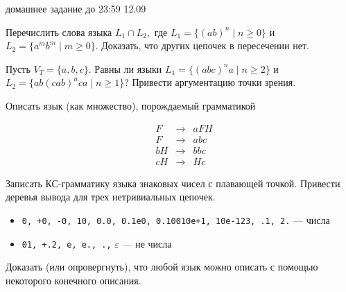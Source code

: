 \documentclass[12pt]{article}
\begin{document}

{\Large домашнее задание до 23:59 12.09}
\bigskip

\enumerate
{
  \item
  {
    Перечислить слова языка $L_1 \cap L_2,$ где $L_1 = \{ (ab)^n \mid n \geq 0 \}$ и $L_2 = \{ a^m b^m \mid m \geq 0 \}$. Доказать, что других цепочек в пересечении нет. 
  }
  \item
  {
    Пусть $V_T = \{a,b,c\}$. Равны ли языки $L_1 = \{ (abc)^n a \mid n \geq 2 \}$ и $L_2 = \{ ab (cab)^n ca \mid n \geq 1 \}$? Привести аргументацию точки зрения. 
  }
  \item
  {
  Описать язык (как множество), порождаемый грамматикой

$$
\begin{array}{crcl}
 &F & {\to} & a F H  \\
 &F &  {\to} & a b c  \\
 &b H &  {\to} & b b c  \\
 &c H &  {\to} & H c
 \end{array}
$$
  }
  \item 
  {
    Записать КС-грамматику языка знаковых чисел с плавающей точкой. Привести деревья вывода для трех нетривиальных цепочек.
    \begin{itemize} 
          \item \verb;0, +0, -0, 10, 0.0, 0.1e0, 0.10010e+1, 10e-123, .1, 2.; --- числа
          \item \verb;01, +.2, e, e., .,; $\varepsilon$ --- не числа
        \end{itemize}
  }
  \item 
  {
    Доказать (или опровергнуть), что любой язык можно описать с помощью некоторого конечного описания.
  }
}
\end{document}
